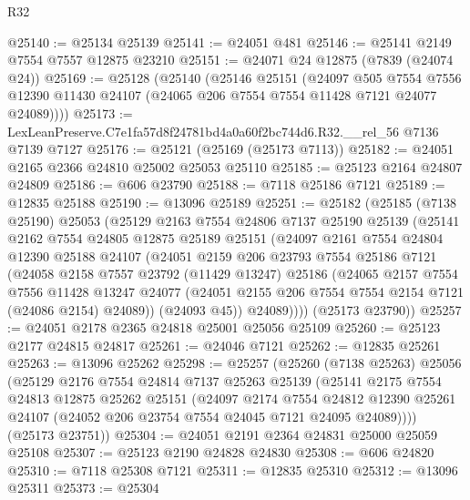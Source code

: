 \begin{lexlean}{R32}
\begin{coremodule}
@25140 := @25134 @25139
@25141 := @24051 @481
@25146 := @25141 @2149 @7554 @7557 @12875 @23210
@25151 := @24071 @24 @12875 (@7839 (@24074 @24))
@25169 := @25128
    (@25140
      (@25146
        @25151
        (@24097
          @505
          @7554
          @7556
          @12390
          @11430
          @24107
          (@24065 @206 @7554 @7554 @11428 @7121 @24077 @24089))))
@25173 := LexLeanPreserve.C7e1fa57d8f24781bd4a0a60f2bc744d6.R32.__rel_56 @7136 @7139 @7127
@25176 := @25121 (@25169 (@25173 @7113))
@25182 := @24051 @2165 @2366 @24810 @25002 @25053 @25110
@25185 := @25123 @2164 @24807 @24809
@25186 := @606 @23790
@25188 := @7118 @25186 @7121
@25189 := @12835 @25188
@25190 := @13096 @25189
@25251 := @25182
    (@25185
      (@7138 @25190)
      @25053
      (@25129
        @2163
        @7554
        @24806
        @7137
        @25190
        @25139
        (@25141
          @2162
          @7554
          @24805
          @12875
          @25189
          @25151
          (@24097
            @2161
            @7554
            @24804
            @12390
            @25188
            @24107
            (@24051
              @2159
              @206
              @23793
              @7554
              @25186
              @7121
              (@24058
                @2158
                @7557
                @23792
                (@11429 @13247)
                @25186
                (@24065
                  @2157
                  @7554
                  @7556
                  @11428
                  @13247
                  @24077
                  (@24051 @2155 @206 @7554 @7554 @2154 @7121 (@24086 @2154) @24089))
                (@24093 @45))
              @24089))))
      (@25173 @23790))
@25257 := @24051 @2178 @2365 @24818 @25001 @25056 @25109
@25260 := @25123 @2177 @24815 @24817
@25261 := @24046 @7121
@25262 := @12835 @25261
@25263 := @13096 @25262
@25298 := @25257
    (@25260
      (@7138 @25263)
      @25056
      (@25129
        @2176
        @7554
        @24814
        @7137
        @25263
        @25139
        (@25141
          @2175
          @7554
          @24813
          @12875
          @25262
          @25151
          (@24097
            @2174
            @7554
            @24812
            @12390
            @25261
            @24107
            (@24052 @206 @23754 @7554 @24045 @7121 @24095 @24089))))
      (@25173 @23751))
@25304 := @24051 @2191 @2364 @24831 @25000 @25059 @25108
@25307 := @25123 @2190 @24828 @24830
@25308 := @606 @24820
@25310 := @7118 @25308 @7121
@25311 := @12835 @25310
@25312 := @13096 @25311
@25373 := @25304

\end{coremodule}
\end{lexlean}
